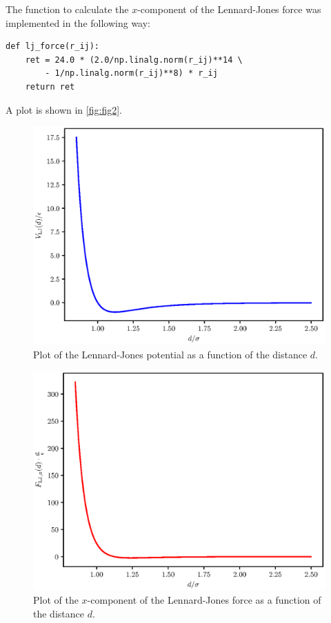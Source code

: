 \documentclass[a4paper,10pt,bibtotoc]{scrartcl}
\begin{document}
The function to calculate the $x$-component of the Lennard-Jones force was implemented in the following way:
\begin{lstlisting}
def lj_force(r_ij):
    ret = 24.0 * (2.0/np.linalg.norm(r_ij)**14 \
        - 1/np.linalg.norm(r_ij)**8) * r_ij
    return ret
\end{lstlisting}
A plot is shown in \autoref{fig:fig2}.

\begin{figure}[t]
 \includegraphics{lennard_jones_potential.eps}
 \caption{Plot of the Lennard-Jones potential as a function of the distance $d$.}
 \label{fig:fig1}
\end{figure}
\begin{figure}[t]
 \includegraphics{lennard_jones_force.eps}
 \caption{Plot of the $x$-component of the Lennard-Jones force as a function of the distance $d$.}
 \label{fig:fig2}
\end{figure}
\end{document}
